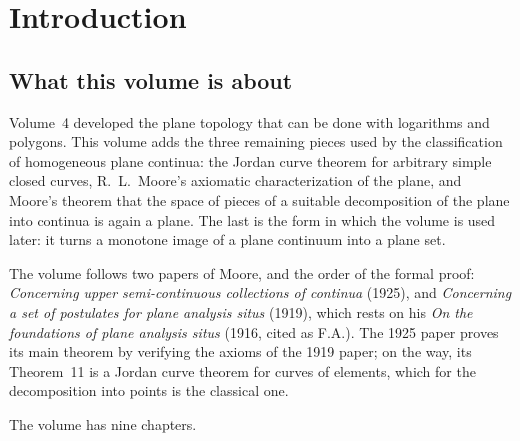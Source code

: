 \chapter{Introduction}\label{ch:intro}

\section{What this volume is about}

Volume~4 developed the plane topology that can be done with logarithms and polygons. This volume
adds the three remaining pieces used by the classification of homogeneous plane continua: the
Jordan curve theorem for arbitrary simple closed curves, R.~L.~Moore's axiomatic characterization of
the plane, and Moore's theorem that the space of pieces of a suitable decomposition of the plane into
continua is again a plane. The last is the form in which the volume is used later: it turns a
monotone image of a plane continuum into a plane set.

The volume follows two papers of Moore, and the order of the formal proof:
\emph{Concerning upper semi-continuous collections of continua} (1925), and \emph{Concerning a set of
postulates for plane analysis situs} (1919), which rests on his \emph{On the foundations of plane
analysis situs} (1916, cited as F.A.). The 1925 paper proves its main theorem by verifying the
axioms of the 1919 paper; on the way, its Theorem~11 is a Jordan curve theorem for curves of
elements, which for the decomposition into points is the classical one.

The volume has nine chapters.

